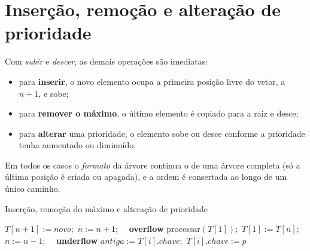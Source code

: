 \section{Inserção, remoção e alteração de prioridade}\label{sec:heapops}
Com \emph{subir} e \emph{descer}, as demais operações são imediatas:
\begin{itemize}
  \item para \textbf{inserir}, o novo elemento ocupa a primeira posição livre do vetor, a $n+1$, e sobe;
  \item para \textbf{remover o máximo}, o último elemento é copiado para a raiz e desce;
  \item para \textbf{alterar} uma prioridade, o elemento sobe ou desce conforme a prioridade tenha aumentado ou diminuído.
\end{itemize}
Em todos os casos o \emph{formato} da árvore continua o de uma árvore completa (só a última posição é criada ou apagada), e a ordem é consertada ao longo de um único caminho.
\begin{pseudo}{Inserção, remoção do máximo e alteração de prioridade}
\begin{algorithmic}
 
   \State $T[n+1]:=novo$;\ $n:=n+1$;\ 
  \Else\ \textbf{overflow}
  \EndIf
\EndProcedure
{}
   \State processar$(T[1])$;\ $T[1]:=T[n]$;\ $n:=n-1$;\ 
  \Else\ \textbf{underflow}
  \EndIf
\EndProcedure
{}
  \State $antiga := T[i].chave$;\ $T[i].chave := p$
   \State {} 
  \Else \State {} 
  \EndIf
\EndProcedure
\end{algorithmic}
\end{pseudo}

